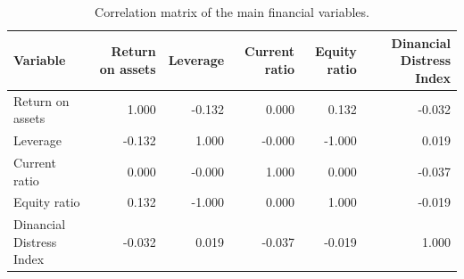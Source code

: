 \begin{table}
\caption{Correlation matrix of the main financial variables.}
\label{tab:financial_correlations}
\begin{tabular}{lrrrrr}
\toprule
Variable & Return on assets & Leverage & Current ratio & Equity ratio & Dinancial Distress Index \\
\midrule
Return on assets & 1.000 & -0.132 & 0.000 & 0.132 & -0.032 \\
Leverage & -0.132 & 1.000 & -0.000 & -1.000 & 0.019 \\
Current ratio & 0.000 & -0.000 & 1.000 & 0.000 & -0.037 \\
Equity ratio & 0.132 & -1.000 & 0.000 & 1.000 & -0.019 \\
Dinancial Distress Index & -0.032 & 0.019 & -0.037 & -0.019 & 1.000 \\
\bottomrule
\end{tabular}
\end{table}
